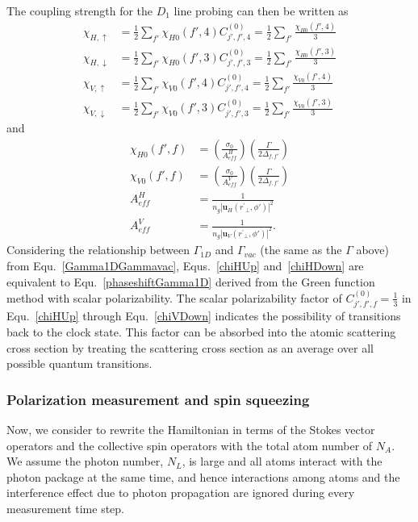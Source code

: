 \documentclass[]{report}
\begin{document}
The coupling strength for the $ D_1 $ line probing can then be written as
\begin{align}
\chi_{H,\uparrow} &=   \frac{1}{2} \sum_{f'} \chi_{H0}(f',4) C_{j',f',4}^{(0)}  =  \frac{1}{2} \sum_{f'} \frac{\chi_{H0}(f',4)}{3} \label{chiHUp}  \\
\chi_{H,\downarrow} &=   \frac{1}{2} \sum_{f'} \chi_{H0}(f',3)  C_{j',f',3}^{(0)} = \frac{1}{2} \sum_{f'} \frac{\chi_{H0}(f',3) }{3} \label{chiHDown}\\
\chi_{V,\uparrow} &=   \frac{1}{2} \sum_{f'} \chi_{V0}(f',4)  C_{j',f',4}^{(0)}  =   \frac{1}{2} \sum_{f'} \frac{\chi_{V0}(f',4)}{3}\label{chiVUp}  \\
\chi_{V,\downarrow} &=   \frac{1}{2} \sum_{f'} \chi_{V0}(f',3)  C_{j',f',3}^{(0)}=   \frac{1}{2} \sum_{f'} \frac{\chi_{V0}(f',3) }{3} \label{chiVDown}
\end{align}
and 
\begin{align}
\chi_{H0}(f',f) &= \left( \frac{ \sigma_0}{A_{ef\!f}^H} \right) \left( \frac{\Gamma}{2 \Delta_{f,f'}} \right)\\
\chi_{V0}(f',f) &= \left( \frac{ \sigma_0}{A_{ef\!f}^V} \right) \left( \frac{\Gamma}{2 \Delta_{f,f'}} \right)\\
A_{ef\!f}^H &= \frac{1}{n_g|\mathbf{u}_{H}(r^\prime\!\!_\perp,\phi')|^2}\\
A_{ef\!f}^V &= \frac{1}{n_g | \mathbf{u}_{V}(r^\prime\!\!_\perp,\phi')|^2}.
\end{align}
Considering the relationship between $ \Gamma_{1D} $ and $ \Gamma_{vac} $ (the same as the $ \Gamma $ above) from Equ.~\eqref{Gamma1DGammavac}, Equs.~\eqref{chiHUp} and~\eqref{chiHDown} are equivalent to Equ.~\eqref{phaseshiftGamma1D} derived from the Green function method with scalar polarizability. The scalar polarizability factor of $ C_{j',f',f}^{(0)}=\frac{1}{3} $ in Equ.~\eqref{chiHUp} through Equ.~\eqref{chiVDown} indicates the possibility of transitions back to the clock state. This factor can be absorbed into the atomic scattering cross section by treating the scattering cross section as an average over all possible quantum transitions. 
 
\subsubsection{Polarization measurement and spin squeezing}
Now, we consider to rewrite the Hamiltonian in terms of the Stokes vector operators and the collective spin operators with the total atom number of $ N_A $. We assume the photon number, $ N_L $, is large and all atoms interact with the photon package at the same time, and hence interactions among atoms and the interference effect due to photon propagation are ignored during every measurement time step. 
\end{document}

